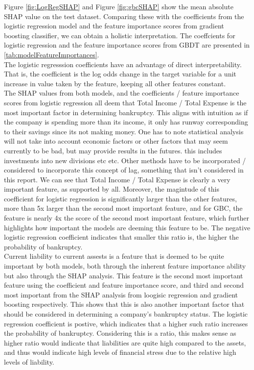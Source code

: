 \documentclass[11pt]{article}
\begin{document}
Figure \ref{fig:LogRegSHAP} and Figure \ref{fig:gbcSHAP} show the mean absolute SHAP value on the test dataset. Comparing these with the coefficients from the logistic regression model and the feature importance scores from gradient boosting classifier, we can obtain a holistic interpretation. The coeffcients for logistic regression and the feature importance scores from GBDT are presented in \ref{tab:modelFeatureImportances}. \\

The logistic regresssion coefficients have an advantage of direct interpretability. That is, the coefficient is the log odds change in the target variable for a unit increase in value taken by the feature, keeping all other features constant. \\

The SHAP values from both models, and the coefficients / feature importance scores from logistic regression all deem that Total Income / Total Expense is the most important factor in determining bankruptcy. This aligns with intuition as if the company is spending more than its income, it only has runway corresponding to their savings since its not making money. One has to note statistical analysis will not take into account economic factors or other factors that may seem currently to be bad, but may provide results in the futures. this includes investments into new divisions etc etc. Other methods have to be incorporated / considered to incorporate this concept of lag, something that isn't considered in this report. We can see that Total Income / Total Expense is clearly a very important feature, as supported by all. Moreover, the magintude of this coefficient for logistic regression is significantly larger than the other features, more than 5x larger than the second most important feature, and for GBC, the feature is nearly 4x the score of the second most important feature, which further highlights how important the models are deeming this feature to be. The negative logistic regression coefficient indicates that smaller this ratio is, the higher the probability of bankruptcy.  \\

Current liability to current assests is a feature that is deemed to be quite important by both models, both through the inherent feature importance ability but also through the SHAP analysis. This feature is the second most important feature using the coefficient and feature importance score, and third and second most important from the SHAP analysis from loogisic regression and gradient boosting respectively. This shows that this is also another important factor that should be considered in determining a company's bankruptcy status. The logistic regression coefficient is postive, which indicates that a higher such ratio increases the probability of bankruptcy. Considering this is a ratio, this makes sense as  higher ratio would indicate that liabilities are quite high compared to the assets, and thus would indicate high levels of financial stress due to the relative high levels of liability. \\ 
\end{document}
